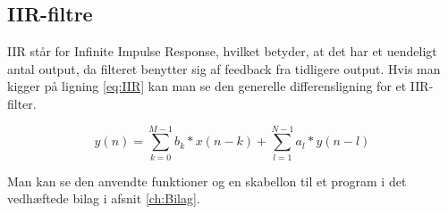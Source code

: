 \subsection{IIR-filtre}
IIR står for Infinite Impulse Response, hvilket betyder, at det har et uendeligt antal output, da filteret benytter sig af feedback fra tidligere output. Hvis man kigger på ligning \eqref{eq:IIR} kan man se den generelle differensligning for et IIR-filter.



\begin{equation}\label{eq:IIR}
{y(n)} = \displaystyle\sum_{k=0}^{M-1} {b_{k}*x(n-k)}+\displaystyle\sum_{l=1}^{N-1} {a_{l}*y(n-l)}
\end{equation}

Man kan se den anvendte funktioner og en skabellon til et program i det vedhæftede bilag i afsnit \ref{ch:Bilag}.



